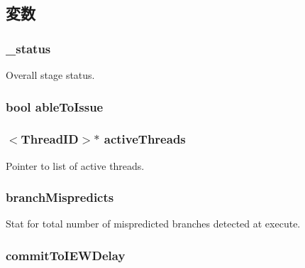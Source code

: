 \subsection{変数}
\hypertarget{classDefaultIEW_a6cdf6e6db875a442f3ab6db542bd2bb5}{
\subsubsection[{\_\-status}]{ {\bf \_\-status}}}
\label{classDefaultIEW_a6cdf6e6db875a442f3ab6db542bd2bb5}
Overall stage status. \hypertarget{classDefaultIEW_a7afe8710ac68efe63b0ae9fcca43853e}{
\subsubsection[{ableToIssue}]{\setlength{\rightskip}{0pt plus 5cm}bool {\bf ableToIssue}}}
\label{classDefaultIEW_a7afe8710ac68efe63b0ae9fcca43853e}
\hypertarget{classDefaultIEW_af6eaea53db532812052f71bf0380dab5}{
\subsubsection[{activeThreads}]{$<${\bf ThreadID}$>$$\ast$ {\bf activeThreads}}}
\label{classDefaultIEW_af6eaea53db532812052f71bf0380dab5}
Pointer to list of active threads. \hypertarget{classDefaultIEW_a84b48267a042d76990dbfb6cec760fcb}{
\subsubsection[{branchMispredicts}]{ {\bf branchMispredicts}}}
\label{classDefaultIEW_a84b48267a042d76990dbfb6cec760fcb}
Stat for total number of mispredicted branches detected at execute. \hypertarget{classDefaultIEW_a6b6fe1148ed7c40758e45f351c375552}{
\subsubsection[{commitToIEWDelay}]{ {\bf commitToIEWDelay}}}
